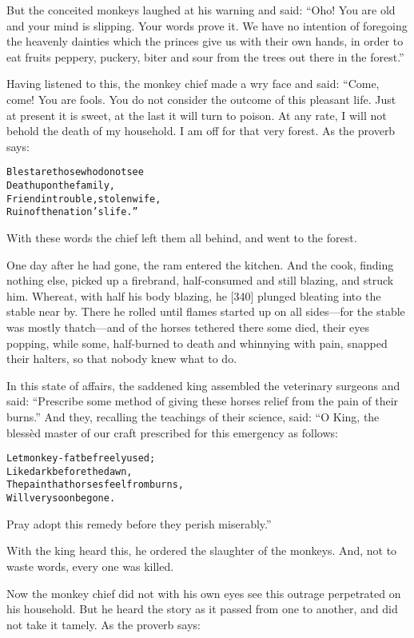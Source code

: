 \documentclass{article}
\renewenvironment{verbatim}{\begin{alltt}\normalfont\begin{centering}}{\end{centering}\end{alltt}}
\begin{document}
But the conceited monkeys laughed at his warning and said:
``Oho! You are old and your mind is slipping. Your words prove it. We have no intention of foregoing the heavenly dainties which the princes give us with their own hands, in order to eat fruits peppery, puckery, biter and sour from the trees out there in the forest.''

Having listened to this, the monkey chief made a wry face and said:
“Come, come! You are fools. You do not consider the outcome of this
pleasant life. Just at present it is sweet, at the last it will
turn to poison. At any rate, I will not behold the death of my
household. I am off for that very forest. As the proverb says:

\begin{verbatim}
Blest are those who do not see
Death upon the family,
Friend in trouble, stolen wife,
Ruin of the nation's life.”
\end{verbatim}
With these words the chief left them all behind, and went to the
forest.

One day after he had gone, the ram entered the kitchen. And the
cook, finding nothing else, picked up a firebrand, half-consumed
and still blazing, and struck him. Whereat, with half his body
blazing, he [340] plunged bleating into the stable near by. There
he rolled until flames started up on all sides---for the stable was
mostly thatch---and of the horses tethered there some died, their
eyes popping, while some, half-burned to death and whinnying with
pain, snapped their halters, so that nobody knew what to do.

In this state of affairs, the saddened king assembled the
veterinary surgeons and said:
``Prescribe some method of giving these horses relief from the pain of their burns.''
And they, recalling the teachings of their science, said: “O King,
the blessèd master of our craft prescribed for this emergency as
follows:

\begin{verbatim}
Let monkey-fat be freely used;
    Like dark before the dawn,
The pain that horses feel from burns,
    Will very soon be gone.
\end{verbatim}
Pray adopt this remedy before they perish miserably.”

With the king heard this, he ordered the slaughter of the monkeys.
And, not to waste words, every one was killed.

Now the monkey chief did not with his own eyes see this outrage
perpetrated on his household. But he heard the story as it passed
from one to another, and did not take it tamely. As the proverb
says:
\end{document}
